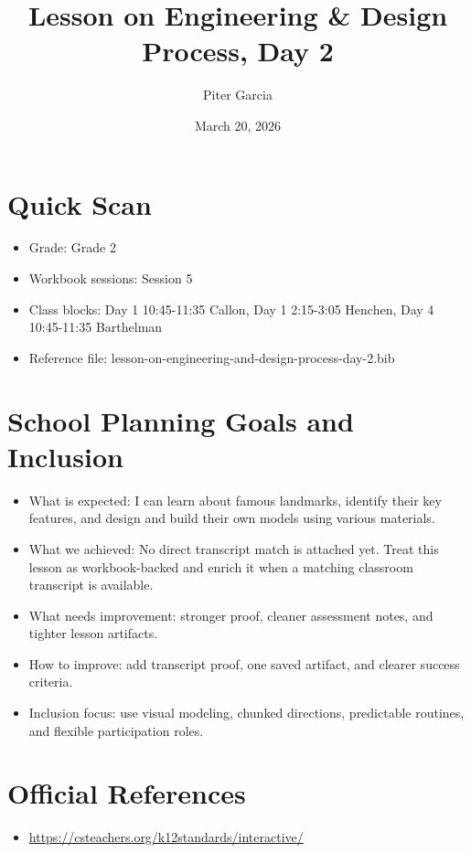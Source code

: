 \documentclass[11pt]{article}
\title{Lesson on Engineering & Design Process, Day 2}
\author{Piter Garcia}
\date{March 20, 2026}
\begin{document}
\maketitle
\section*{Quick Scan}
\begin{itemize}[leftmargin=*]
\item Grade: Grade 2
\item Workbook sessions: Session 5
\item Class blocks: Day 1 10:45-11:35 Callon, Day 1 2:15-3:05 Henchen, Day 4 10:45-11:35 Barthelman
\item Reference file: lesson-on-engineering-and-design-process-day-2.bib
\end{itemize}
\section*{School Planning Goals and Inclusion}
\begin{itemize}[leftmargin=*]
\item What is expected: I can learn about famous landmarks, identify their key features, and design and build their own models using various materials.
\item What we achieved: No direct transcript match is attached yet. Treat this lesson as workbook-backed and enrich it when a matching classroom transcript is available.
\item What needs improvement: stronger proof, cleaner assessment notes, and tighter lesson artifacts.
\item How to improve: add transcript proof, one saved artifact, and clearer success criteria.
\item Inclusion focus: use visual modeling, chunked directions, predictable routines, and flexible participation roles.
\end{itemize}
\section*{Official References}
\begin{itemize}[leftmargin=*]
\item \url{https://csteachers.org/k12standards/interactive/}

\end{itemize}
\end{document}
